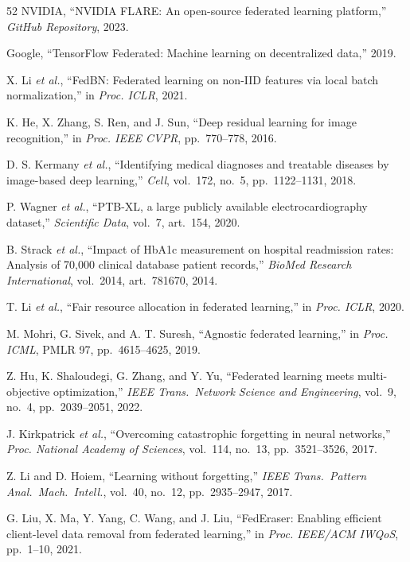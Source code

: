 \documentclass[conference,a4paper]{IEEEtran}
\begin{document}
\begin{thebibliography}{52}
NVIDIA, ``NVIDIA FLARE: An open-source federated learning platform,'' \textit{GitHub Repository}, 2023.

Google, ``TensorFlow Federated: Machine learning on decentralized data,'' 2019.

X. Li \textit{et al.}, ``FedBN: Federated learning on non-IID features via local batch normalization,'' in \textit{Proc. ICLR}, 2021.

K. He, X. Zhang, S. Ren, and J. Sun, ``Deep residual learning for image recognition,'' in \textit{Proc. IEEE CVPR}, pp.~770--778, 2016.

D. S. Kermany \textit{et al.}, ``Identifying medical diagnoses and treatable diseases by image-based deep learning,'' \textit{Cell}, vol.~172, no.~5, pp.~1122--1131, 2018.

P. Wagner \textit{et al.}, ``PTB-XL, a large publicly available electrocardiography dataset,'' \textit{Scientific Data}, vol.~7, art.~154, 2020.

B. Strack \textit{et al.}, ``Impact of HbA1c measurement on hospital readmission rates: Analysis of 70,000 clinical database patient records,'' \textit{BioMed Research International}, vol.~2014, art.~781670, 2014.

T. Li \textit{et al.}, ``Fair resource allocation in federated learning,'' in \textit{Proc. ICLR}, 2020.

M. Mohri, G. Sivek, and A. T. Suresh, ``Agnostic federated learning,'' in \textit{Proc. ICML}, PMLR 97, pp.~4615--4625, 2019.

Z. Hu, K. Shaloudegi, G. Zhang, and Y. Yu, ``Federated learning meets multi-objective optimization,'' \textit{IEEE Trans.~Network Science and Engineering}, vol.~9, no.~4, pp.~2039--2051, 2022.

J. Kirkpatrick \textit{et al.}, ``Overcoming catastrophic forgetting in neural networks,'' \textit{Proc. National Academy of Sciences}, vol.~114, no.~13, pp.~3521--3526, 2017.

Z. Li and D. Hoiem, ``Learning without forgetting,'' \textit{IEEE Trans.~Pattern Anal.~Mach.~Intell.}, vol.~40, no.~12, pp.~2935--2947, 2017.

G. Liu, X. Ma, Y. Yang, C. Wang, and J. Liu, ``FedEraser: Enabling efficient client-level data removal from federated learning,'' in \textit{Proc. IEEE/ACM IWQoS}, pp.~1--10, 2021.


\end{thebibliography}
\end{document}
